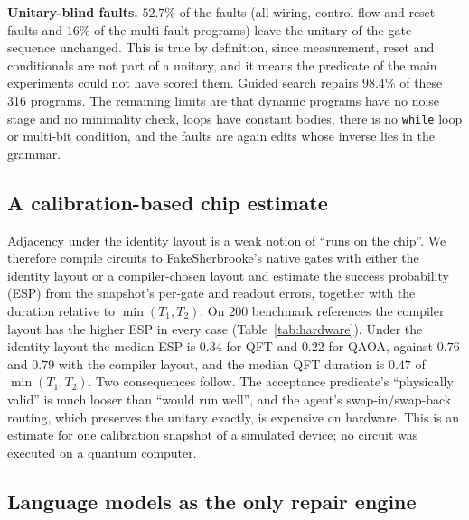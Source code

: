 \documentclass[journal]{IEEEtran}
\begin{document}
\textbf{Unitary-blind faults.} $52.7\%$ of the faults (all wiring, control-flow and reset
faults and $16\%$ of the multi-fault programs) leave the unitary of the gate sequence
unchanged. This is true by definition, since measurement, reset and conditionals are not part
of a unitary, and it means the predicate of the main experiments could not have scored them.
Guided search repairs $98.4\%$ of these 316 programs. The remaining limits are that dynamic
programs have no noise stage and no minimality check, loops have constant bodies, there is no
\texttt{while} loop or multi-bit condition, and the faults are again edits whose inverse lies
in the grammar.

\subsection{A calibration-based chip estimate}

Adjacency under the identity layout is a weak notion of ``runs on the chip''. We therefore
compile circuits to FakeSherbrooke's native gates with either the identity layout or a
compiler-chosen layout and estimate the success probability (ESP) from the snapshot's
per-gate and readout errors, together with the duration relative to $\min(T_1,T_2)$. On 200
benchmark references the compiler layout has the higher ESP in every case
(Table~\ref{tab:hardware}). Under the identity layout the median ESP is $0.34$ for QFT and
$0.22$ for QAOA, against $0.76$ and $0.79$ with the compiler layout, and the median
QFT duration is $0.47$ of $\min(T_1,T_2)$. Two consequences follow. The acceptance predicate's
``physically valid'' is much looser than ``would run well'', and the agent's swap-in/swap-back
routing, which preserves the unitary exactly, is expensive on hardware. This is an estimate for
one calibration snapshot of a simulated device; no circuit was executed on a quantum
computer.



\subsection{Language models as the only repair engine}
\end{document}

